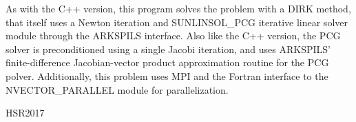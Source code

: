 \documentclass[letterpaper,10pt,english]{sphinxmanual}
\begin{document}
As with the C++ version, this program solves the problem with a DIRK
method, that itself uses a Newton iteration and SUNLINSOL\_PCG
iterative linear solver module through the ARKSPILS interface.  Also
like the C++ version, the PCG solver is preconditioned using a single
Jacobi iteration, and uses ARKSPILS’ finite-difference Jacobian-vector
product approximation routine for the PCG polver.  Additionally, this
problem uses MPI and the Fortran interface to the NVECTOR\_PARALLEL
module for parallelization.
\label{\detokenize{References:references}}
\begin{sphinxthebibliography}{HSR2017}
\end{sphinxthebibliography}



\renewcommand{\indexname}{Index}
\printindex
\end{document}
